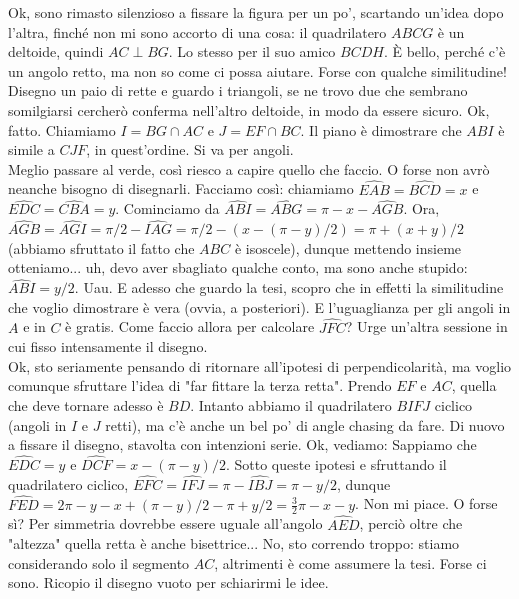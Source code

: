\begin{sol}
  Ok, sono rimasto silenzioso a fissare la figura per un po', scartando un'idea dopo l'altra, finché non mi sono accorto di una cosa: il quadrilatero $ABCG$ è un deltoide, quindi $AC \perp BG$. Lo stesso per il suo amico $BCDH$. È bello, perché c'è un angolo retto, ma non so come ci possa aiutare. Forse con qualche similitudine! Disegno un paio di rette e guardo i triangoli, se ne trovo due che sembrano somilgiarsi cercherò conferma nell'altro deltoide, in modo da essere sicuro. Ok, fatto. Chiamiamo $I=BG \cap AC$ e $J=EF \cap BC$. Il piano è dimostrare che $ABI$ è simile a $CJF$, in quest'ordine. Si va per angoli. \\

  Meglio passare al verde, così riesco a capire quello che faccio. O forse non avrò neanche bisogno di disegnarli. Facciamo così: chiamiamo $\widehat{EAB}=\widehat{BCD}=x$ e $\widehat{EDC}=\widehat{CBA}=y$. Cominciamo da $\widehat{ABI}=\widehat{ABG}=\pi-x-\widehat{AGB}$. Ora, $\widehat{AGB}=\widehat{AGI}=\pi/2-\widehat{IAG}=\pi/2-(x-(\pi-y)/2)=\pi+(x+y)/2$ (abbiamo sfruttato il fatto che $ABC$ è isoscele), dunque mettendo insieme otteniamo...
  uh, devo aver sbagliato qualche conto, ma sono anche stupido: $\widehat{ABI}=y/2$. Uau. E adesso che guardo la tesi, scopro che in effetti la similitudine che voglio dimostrare è vera (ovvia, a posteriori). E l'uguaglianza per gli angoli in $A$ e in $C$ è gratis. Come faccio allora per calcolare $\widehat{JFC}$? Urge un'altra sessione in cui fisso intensamente il disegno. \\

  Ok, sto seriamente pensando di ritornare all'ipotesi di perpendicolarità, ma voglio comunque sfruttare l'idea di "far fittare la terza retta". Prendo $EF$ e $AC$, quella che deve tornare adesso è $BD$. Intanto abbiamo il quadrilatero $BIFJ$ ciclico (angoli in $I$ e $J$ retti), ma c'è anche un bel po' di angle chasing da fare. Di nuovo a fissare il disegno, stavolta con intenzioni serie. Ok, vediamo: Sappiamo che $\widehat{EDC}=y$ e $\widehat{DCF}=x-(\pi-y)/2$. Sotto queste ipotesi e sfruttando il quadrilatero ciclico, $\widehat{EFC}=\widehat{IFJ}=\pi-\widehat{IBJ}=\pi-y/2$, dunque $\widehat{FED}=2\pi-y-x+(\pi-y)/2-\pi+y/2=\frac{3}{2}\pi-x-y$.
  Non mi piace. O forse sì? Per simmetria dovrebbe essere uguale all'angolo $\widehat{AED}$, perciò oltre che "altezza" quella retta è anche bisettrice... No, sto correndo troppo: stiamo considerando solo il segmento $AC$, altrimenti è come assumere la tesi. Forse ci sono. Ricopio il disegno vuoto per schiarirmi le idee.


\end{sol}
